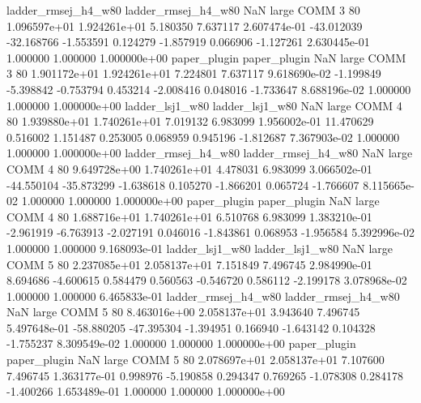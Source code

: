 ladder_rmsej_h4_w80 ladder_rmsej_h4_w80                   NaN      large     COMM                 3 80 1.096597e+01   1.924261e+01      5.180350       7.637117  2.607474e-01    -43.012039    -32.168766    -1.553591       0.124279 -1.857919   0.066906    -1.127261   2.630445e-01            1.000000        1.000000        1.000000e+00
       paper_plugin        paper_plugin                   NaN      large     COMM                 3 80 1.901172e+01   1.924261e+01      7.224801       7.637117  9.618690e-02     -1.199849     -5.398842    -0.753794       0.453214 -2.008416   0.048016    -1.733647   8.688196e-02            1.000000        1.000000        1.000000e+00
    ladder_lsj1_w80     ladder_lsj1_w80                   NaN      large     COMM                 4 80 1.939880e+01   1.740261e+01      7.019132       6.983099  1.956002e-01     11.470629      0.516002     1.151487       0.253005  0.068959   0.945196    -1.812687   7.367903e-02            1.000000        1.000000        1.000000e+00
ladder_rmsej_h4_w80 ladder_rmsej_h4_w80                   NaN      large     COMM                 4 80 9.649728e+00   1.740261e+01      4.478031       6.983099  3.066502e-01    -44.550104    -35.873299    -1.638618       0.105270 -1.866201   0.065724    -1.766607   8.115665e-02            1.000000        1.000000        1.000000e+00
       paper_plugin        paper_plugin                   NaN      large     COMM                 4 80 1.688716e+01   1.740261e+01      6.510768       6.983099  1.383210e-01     -2.961919     -6.763913    -2.027191       0.046016 -1.843861   0.068953    -1.956584   5.392996e-02            1.000000        1.000000        9.168093e-01
    ladder_lsj1_w80     ladder_lsj1_w80                   NaN      large     COMM                 5 80 2.237085e+01   2.058137e+01      7.151849       7.496745  2.984990e-01      8.694686     -4.600615     0.584479       0.560563 -0.546720   0.586112    -2.199178   3.078968e-02            1.000000        1.000000        6.465833e-01
ladder_rmsej_h4_w80 ladder_rmsej_h4_w80                   NaN      large     COMM                 5 80 8.463016e+00   2.058137e+01      3.943640       7.496745  5.497648e-01    -58.880205    -47.395304    -1.394951       0.166940 -1.643142   0.104328    -1.755237   8.309549e-02            1.000000        1.000000        1.000000e+00
       paper_plugin        paper_plugin                   NaN      large     COMM                 5 80 2.078697e+01   2.058137e+01      7.107600       7.496745  1.363177e-01      0.998976     -5.190858     0.294347       0.769265 -1.078308   0.284178    -1.400266   1.653489e-01            1.000000        1.000000        1.000000e+00

